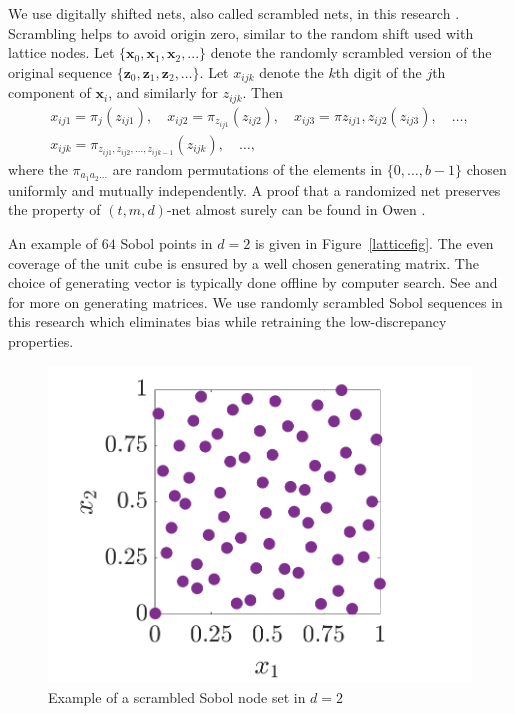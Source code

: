 \documentclass{iitthesis}          %
\newcommand{\bm}[1]{\boldsymbol{#1}}
\newcommand{\vx}{\bm{x}}
\newcommand{\vz}{\bm{z}}
\newcommand\figref{Figure~\ref}
\newcommand{\JRNote}[1]{{\textcolor{green}{JR: #1}}}
\begin{document}

We use digitally shifted nets, also called scrambled nets, in this research \cite{HicYue00}. Scrambling helps to avoid origin zero, similar to the random shift used with lattice nodes.
Let $\{\vx_0, \vx_1, \vx_2, ...\}$ denote the randomly scrambled version of the original sequence $\{\vz_0, \vz_1, \vz_2, \dots \}$. Let $x_{ijk}$ denote the $k$\textup{th} digit of the $j$\textup{th} component of $\vx_i$, and similarly for $z_{ijk}$. Then
\begin{align*}
x_{ij1} = \pi_j( z_{ij1}), \quad x_{ij2} = \pi_{z_{ij1}} ( z_{ij2}), \quad x_{ij3} = \pi{z_{ij1}, z_{ij2}} ( z_{ij3}), \quad \dots , \\
x_{ijk} = \pi_{z_{ij 1}, z_{ij2}, \dots, z_{ijk-1}} ( z_{ijk}), \quad \dots , \qquad \qquad \qquad
\end{align*}
where the $\pi_{a_1a_2 \dots}$ are random permutations of the elements in $\{0,\dots,b-1\}$ chosen uniformly and mutually independently. A proof that a randomized net preserves the property of $(t, m, d)$-net almost surely can be found in Owen \cite{Owe95}.



An example of $64$ Sobol points in $d=2$ is given in \figref{latticefig}.  The even coverage of the unit cube is ensured by a well chosen generating matrix.  The choice of generating vector is typically done offline by computer search.  See \cite{KuoNuyens2016} and \cite{NuySoft} for more on generating matrices. We use randomly scrambled Sobol sequences in this research \cite{HonHic00a} which eliminates bias while retraining the low-discrepancy properties. 

\begin{figure}[htp]
	\centering
	\includegraphics[width=0.8\linewidth]{SSobolPoints}
	\caption{Example of a scrambled Sobol node set  in $d=2$ \label{sobolfig} }
\end{figure}
\end{document}
